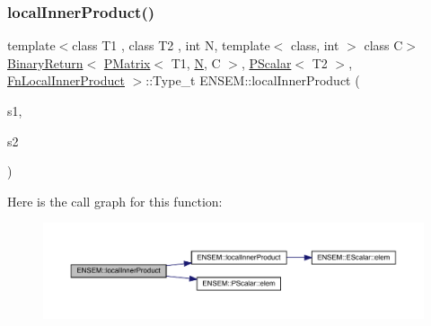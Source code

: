 \subsubsection{\texorpdfstring{localInnerProduct()}{localInnerProduct()}\hspace{0.1cm}{\footnotesize\ttfamily [2/3]}}
{\footnotesize\ttfamily template$<$class T1 , class T2 , int N, template$<$ class, int $>$ class C$>$ \\
\mbox{\hyperlink{structENSEM_1_1BinaryReturn}{Binary\+Return}}$<$ \mbox{\hyperlink{classENSEM_1_1PMatrix}{P\+Matrix}}$<$ T1, \mbox{\hyperlink{adat__devel_2lib_2hadron_2operator__name__util_8cc_a7722c8ecbb62d99aee7ce68b1752f337}{N}}, C $>$, \mbox{\hyperlink{classENSEM_1_1PScalar}{P\+Scalar}}$<$ T2 $>$, \mbox{\hyperlink{structENSEM_1_1FnLocalInnerProduct}{Fn\+Local\+Inner\+Product}} $>$\+::Type\+\_\+t E\+N\+S\+E\+M\+::local\+Inner\+Product (\begin{DoxyParamCaption}\item[{const \mbox{\hyperlink{classENSEM_1_1PMatrix}{P\+Matrix}}$<$ T1, \mbox{\hyperlink{adat__devel_2lib_2hadron_2operator__name__util_8cc_a7722c8ecbb62d99aee7ce68b1752f337}{N}}, C $>$ \&}]{s1,  }\item[{const \mbox{\hyperlink{classENSEM_1_1PScalar}{P\+Scalar}}$<$ T2 $>$ \&}]{s2 }\end{DoxyParamCaption})\hspace{0.3cm}{\ttfamily [inline]}}

Here is the call graph for this function\+:\nopagebreak
\begin{figure}[H]
\begin{center}
\leavevmode
\includegraphics[width=350pt]{df/d0a/group__primmatrix_gafc7ce30ddacb0b13e2db237cfa268161_cgraph}
\end{center}
\end{figure}
\mbox{\label{group__primmatrix_gaaa8729c59af4a03489be7e620e3dd187}} 
